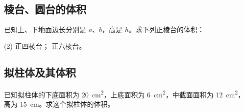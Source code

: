 \begin{Exercise}
  \begin{question}
    \item 
    \item 
    \item 
    \item 
    \item 
    \item 
    \item 
    \item 
    \item 
  \end{question}
\end{Exercise}

\subsection{棱台、圆台的体积}
\begin{Practice}
  已知上、下地面边长分别是 $a$、$b$，高是 $h$。求下列正棱台的体积：
  \begin{tasks}(2)
    \task 正四棱台；
    \task 正六棱台。
  \end{tasks}
\end{Practice}
\subsection{拟柱体及其体积}
\begin{Practice}
  已知拟柱体的下底面积为 \qty{20}{cm^2}，上底面积为 \qty{6}{cm^2}，中截面面积为 \qty{12}{cm^2}，高为 \qty{15}{cm}。求这个拟柱体的体积。
\end{Practice}
\begin{Exercise}
  \begin{question}
    \item 
    \item 
    \item 
    \item 
    \item 
    \item 
    \item 
    \item 
    \item 
    \item 
    \item 
    \item 
    \item 
  \end{question}
\end{Exercise}

